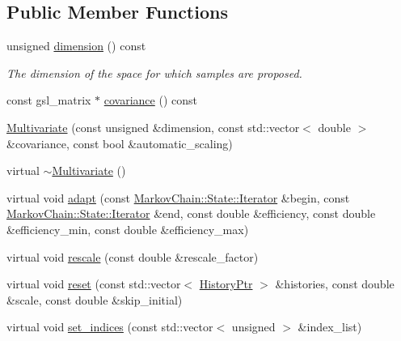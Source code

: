 \subsection*{Public Member Functions}
\begin{DoxyCompactItemize}
\item 
unsigned \hyperlink{classeos_1_1proposal__functions_1_1Multivariate_aa7a6807a556a5187c77080d6b2036deb}{dimension} () const 
\begin{DoxyCompactList}\small\item\em The dimension of the space for which samples are proposed. \item\end{DoxyCompactList}\item 
const gsl\_\-matrix $\ast$ \hyperlink{classeos_1_1proposal__functions_1_1Multivariate_a54a59c24424caeb5e826d61d63edd95d}{covariance} () const 
\item 
\hyperlink{classeos_1_1proposal__functions_1_1Multivariate_a0f3a2171c1b20ef0f4cb4588185981aa}{Multivariate} (const unsigned \&dimension, const std::vector$<$ double $>$ \&covariance, const bool \&automatic\_\-scaling)
\item 
virtual \hyperlink{classeos_1_1proposal__functions_1_1Multivariate_a2b216d8b68102068c721f758d562485d}{$\sim$Multivariate} ()
\item 
virtual void \hyperlink{classeos_1_1proposal__functions_1_1Multivariate_a03a15f539c8b7eeefb7e323d8c3cd15d}{adapt} (const \hyperlink{structeos_1_1MarkovChain_1_1State_ad7590843e4feca7e696c53863e6e10c1}{MarkovChain::State::Iterator} \&begin, const \hyperlink{structeos_1_1MarkovChain_1_1State_ad7590843e4feca7e696c53863e6e10c1}{MarkovChain::State::Iterator} \&end, const double \&efficiency, const double \&efficiency\_\-min, const double \&efficiency\_\-max)
\item 
virtual void \hyperlink{classeos_1_1proposal__functions_1_1Multivariate_a5f1d1b34460d12e1446dc5ff0fa714ee}{rescale} (const double \&rescale\_\-factor)
\item 
virtual void \hyperlink{classeos_1_1proposal__functions_1_1Multivariate_a830b00fd34f3b65922eeef04d76269e9}{reset} (const std::vector$<$ \hyperlink{namespaceeos_ac9f30fde04446cfabdd69d4b5b5d3c5a}{HistoryPtr} $>$ \&histories, const double \&scale, const double \&skip\_\-initial)
\item 
virtual void \hyperlink{classeos_1_1proposal__functions_1_1Multivariate_ac143e4c3d64075a86a6aa837d187d134}{set\_\-indices} (const std::vector$<$ unsigned $>$ \&index\_\-list)
\end{DoxyCompactItemize}
